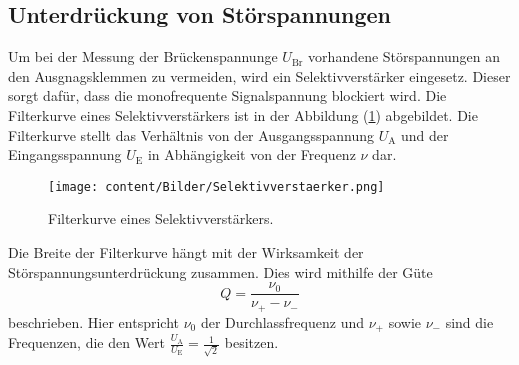 \subsection{Unterdrückung von Störspannungen}
Um bei der Messung der Brückenspannunge $U_{\text{Br}}$ vorhandene Störspannungen an den Ausgnagsklemmen zu vermeiden, 
wird ein Selektivverstärker eingesetz. Dieser sorgt dafür, dass die monofrequente Signalspannung blockiert wird. Die Filterkurve 
eines Selektivverstärkers ist in der Abbildung (\ref{fig:Selektivverstaerker}) abgebildet. Die Filterkurve stellt das Verhältnis von 
der Ausgangsspannung $U_{\text{A}}$ und der Eingangsspannung $U_{\text{E}}$ in Abhängigkeit von der Frequenz $\nu$ dar.
\begin{figure}[H]
    \centering
    \texttt{[image: content/Bilder/Selektivverstaerker.png]}
    \caption{Filterkurve eines Selektivverstärkers\cite{anleitungV606}.}
    \label{fig:Selektivverstaerker}
\end{figure} 
Die Breite der Filterkurve hängt mit der Wirksamkeit der Störspannungsunterdrückung zusammen.
Dies wird mithilfe der Güte 
\begin{equation}
    Q = \frac{\nu _0}{\nu _{+}- \nu _{-}}
    \label{eqn:Guete}
\end{equation}
beschrieben. Hier entspricht $\nu_0$ der Durchlassfrequenz und $\nu _{+}$ sowie $\nu _{-}$ sind die Frequenzen, die den Wert $\frac{U_{\text{A}}}{U_{\text{E}}} = \frac{1}{\sqrt{2}}$ besitzen. 
